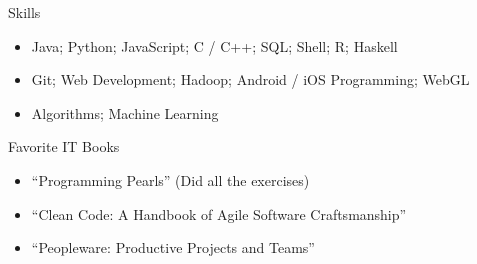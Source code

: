 \documentclass[]{mcdowellcv}
\begin{document}
	\begin{cvsection}{Skills}
		\begin{cvsubsection}{}{}{}
			\begin{itemize}
				\item Java; Python; JavaScript; C / C++; SQL; Shell; R; Haskell
				\item Git; Web Development; Hadoop; Android / iOS Programming; WebGL
				\item Algorithms; Machine Learning
			\end{itemize}
		\end{cvsubsection}
	\end{cvsection}
	
	\begin{cvsection}{Favorite IT Books}
		\begin{cvsubsection}{}{}{}
			\begin{itemize}
				\item ``Programming Pearls'' (Did all the exercises)
				\item ``Clean Code: A Handbook of Agile Software Craftsmanship''
				\item ``Peopleware: Productive Projects and Teams''
			\end{itemize}
		\end{cvsubsection}
	\end{cvsection}
	
\end{document}
